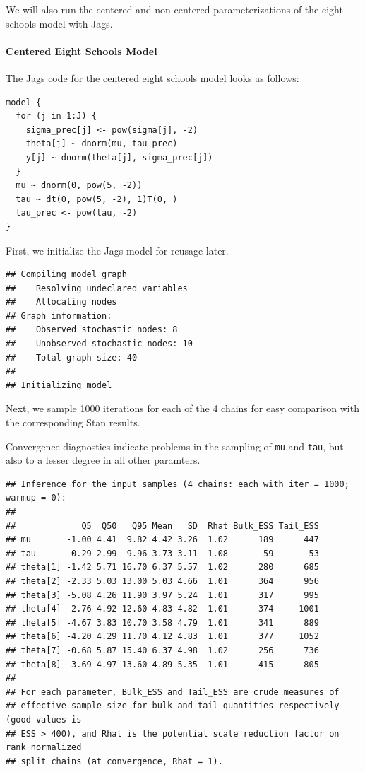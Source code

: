 \documentclass[american,]{article}
\let\oldparagraph\paragraph
\renewcommand{\paragraph}[1]{\oldparagraph{#1}\mbox{}}
\begin{document}
We will also run the centered and non-centered parameterizations of the
eight schools model with Jags.

\hypertarget{centered-eight-schools-model-1}{%
\paragraph{Centered Eight Schools
Model}\label{centered-eight-schools-model-1}}

The Jags code for the centered eight schools model looks as follows:

\begin{verbatim}
model {
  for (j in 1:J) {
    sigma_prec[j] <- pow(sigma[j], -2)
    theta[j] ~ dnorm(mu, tau_prec)
    y[j] ~ dnorm(theta[j], sigma_prec[j])
  }
  mu ~ dnorm(0, pow(5, -2))
  tau ~ dt(0, pow(5, -2), 1)T(0, )
  tau_prec <- pow(tau, -2)
}
\end{verbatim}

First, we initialize the Jags model for reusage later.

\begin{verbatim}
## Compiling model graph
##    Resolving undeclared variables
##    Allocating nodes
## Graph information:
##    Observed stochastic nodes: 8
##    Unobserved stochastic nodes: 10
##    Total graph size: 40
## 
## Initializing model
\end{verbatim}

Next, we sample 1000 iterations for each of the 4 chains for easy
comparison with the corresponding Stan results.

Convergence diagnostics indicate problems in the sampling of \texttt{mu}
and \texttt{tau}, but also to a lesser degree in all other paramters.

\begin{verbatim}
## Inference for the input samples (4 chains: each with iter = 1000; warmup = 0):
## 
##             Q5  Q50   Q95 Mean   SD  Rhat Bulk_ESS Tail_ESS
## mu       -1.00 4.41  9.82 4.42 3.26  1.02      189      447
## tau       0.29 2.99  9.96 3.73 3.11  1.08       59       53
## theta[1] -1.42 5.71 16.70 6.37 5.57  1.02      280      685
## theta[2] -2.33 5.03 13.00 5.03 4.66  1.01      364      956
## theta[3] -5.08 4.26 11.90 3.97 5.24  1.01      317      995
## theta[4] -2.76 4.92 12.60 4.83 4.82  1.01      374     1001
## theta[5] -4.67 3.83 10.70 3.58 4.79  1.01      341      889
## theta[6] -4.20 4.29 11.70 4.12 4.83  1.01      377     1052
## theta[7] -0.68 5.87 15.40 6.37 4.98  1.02      256      736
## theta[8] -3.69 4.97 13.60 4.89 5.35  1.01      415      805
## 
## For each parameter, Bulk_ESS and Tail_ESS are crude measures of 
## effective sample size for bulk and tail quantities respectively (good values is 
## ESS > 400), and Rhat is the potential scale reduction factor on rank normalized
## split chains (at convergence, Rhat = 1).
\end{verbatim}
\end{document}
